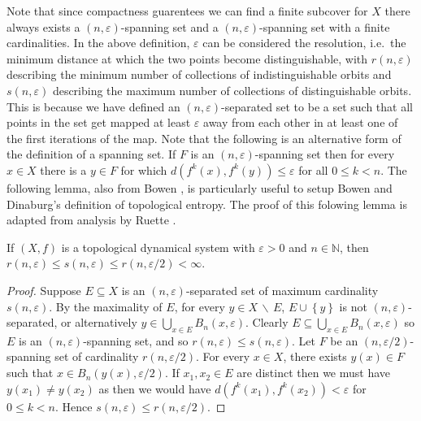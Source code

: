 Note that since compactness guarentees we can find a finite subcover for $X$ there always exists a $(n, \varepsilon)$-spanning set and a $(n, \varepsilon)$-spanning set with a finite cardinalities. In the above definition, $\varepsilon$ can be considered the resolution, i.e.\ the minimum distance at which the two points become distinguishable, with $r(n, \varepsilon)$ describing the minimum number of collections of indistinguishable orbits and $s(n, \varepsilon)$ describing the maximum number of collections of distinguishable orbits. This is because we have defined an $(n, \varepsilon)$-separated set to be a set such that all points in the set get mapped at least $\varepsilon$ away from each other in at least one of the first iterations of the map. Note that the following is an alternative form of the definition of a spanning set. If $F$ is an $(n, \varepsilon)$-spanning set then for every $x \in X$ there is a $y \in F$ for which $d(f^k(x), f^k(y)) \leq \varepsilon$ for all $0 \leq k < n$. The following lemma, also from Bowen \cite{bowen}, is particularly useful to setup Bowen and Dinaburg's definition of topological entropy. The proof of this folowing lemma is adapted from analysis by Ruette \cite[§4.1]{ruette}.

\begin{lem} \label{lem:finite-maximum-minimum-spanning-separated}
    If $(X, f)$ is a topological dynamical system with $\varepsilon > 0$ and $n \in \mathbb{N}$, then $r(n, \varepsilon) \leq s(n, \varepsilon) \leq r(n, \varepsilon / 2) < \infty$.
    \begin{proof}
        Suppose $E \subseteq X$ is an $(n, \varepsilon)$-separated set of maximum cardinality $s(n, \varepsilon)$. By the maximality of $E$, for every $y \in X\, \backslash \, E$, $E \cup \left\lbrace y \right\rbrace$ is not $(n, \varepsilon)$-separated, or alternatively $y \in \bigcup_{x \in E}B_n(x, \varepsilon)$. Clearly $E \subseteq \bigcup_{x \in E}B_n(x, \varepsilon)$ so $E$ is an $(n, \varepsilon)$-spanning set, and so $r(n, \varepsilon) \leq s(n, \varepsilon)$. Let $F$ be an $(n, \varepsilon / 2)$-spanning set of cardinality $r(n, \varepsilon / 2)$. For every $x \in X$, there exists $y(x) \in F$ such that $x \in B_n(y(x), \varepsilon / 2)$. If $x_1, x_2 \in E$ are distinct then we must have $y(x_1) \neq y(x_2)$ as then we would have $d(f^k(x_1), f^k(x_2)) < \varepsilon$ for $0 \leq k < n$. Hence $s(n, \varepsilon) \leq r(n, \varepsilon / 2)$.
    \end{proof}
\end{lem}

